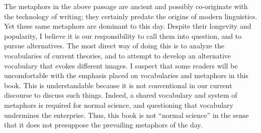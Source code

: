 The metaphors in the above passage are ancient and possibly co-originate with the technology of writing; they certainly predate the origins of modern linguistics. Yet these same metaphors are dominant to this day. Despite their longevity and popularity, I believe it is our responsibility to call them into question, and to pursue alternatives. The most direct way of doing this is to analyze the vocabularies of current theories, and to attempt to develop an alternative vocabulary that evokes different images. I suspect that some readers will be uncomfortable with the emphasis placed on vocabularies and metaphors in this book. This is understandable because it is not conventional in our current discourse to discuss such things. Indeed, a shared vocabulary and system of metaphors is required for normal science, and questioning that vocabulary undermines the enterprise. Thus, this book is not “normal science” in the sense that it does not presuppose the prevailing metaphors of the day.

